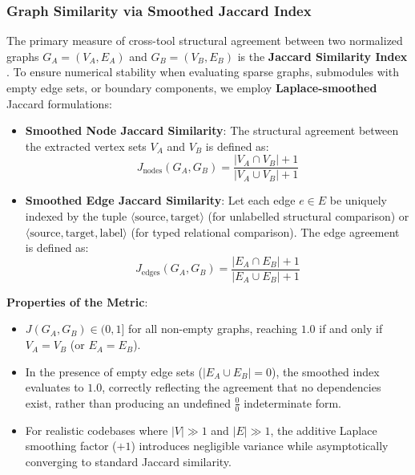 \subsubsection{Graph Similarity via Smoothed Jaccard Index}
\label{subsec:jaccard_similarity}

The primary measure of cross-tool structural agreement between two
normalized graphs $G_A = (V_A, E_A)$ and $G_B = (V_B, E_B)$ is the
\textbf{Jaccard Similarity Index} \cite{ortin_empirical_2022}. To
ensure numerical stability when evaluating sparse graphs, submodules
with empty edge sets, or boundary components, we employ
\textbf{Laplace-smoothed} Jaccard formulations:

\begin{itemize}
  \item \textbf{Smoothed Node Jaccard Similarity}:
    The structural agreement between the extracted vertex sets $V_A$
    and $V_B$ is defined as:
    \begin{equation}
      J_{\text{nodes}}(G_A, G_B) = \frac{|V_A \cap V_B| + 1}{|V_A \cup V_B| + 1}
    \end{equation}
  \item \textbf{Smoothed Edge Jaccard Similarity}:
    Let each edge $e \in E$ be uniquely indexed by the tuple $\langle
    \text{source}, \text{target} \rangle$ (for unlabelled structural
    comparison) or $\langle \text{source}, \text{target}, \text{label}
    \rangle$ (for typed relational comparison). The edge agreement is
    defined as:
    \begin{equation}
      J_{\text{edges}}(G_A, G_B) = \frac{|E_A \cap E_B| + 1}{|E_A \cup E_B| + 1}
    \end{equation}
\end{itemize}

\noindent
\textbf{Properties of the Metric}:
\begin{itemize}
  \item $J(G_A, G_B) \in (0, 1]$ for all non-empty graphs, reaching
    $1.0$ if and only if $V_A = V_B$ (or $E_A = E_B$).
  \item In the presence of empty edge sets ($|E_A \cup E_B| = 0$),
    the smoothed index evaluates to $1.0$, correctly reflecting the
    agreement that no dependencies exist, rather than producing an
    undefined $\frac{0}{0}$ indeterminate form.
  \item For realistic codebases where $|V| \gg 1$ and $|E| \gg 1$,
    the additive Laplace smoothing factor ($+1$) introduces
    negligible variance while asymptotically converging to standard
    Jaccard similarity.
\end{itemize}

